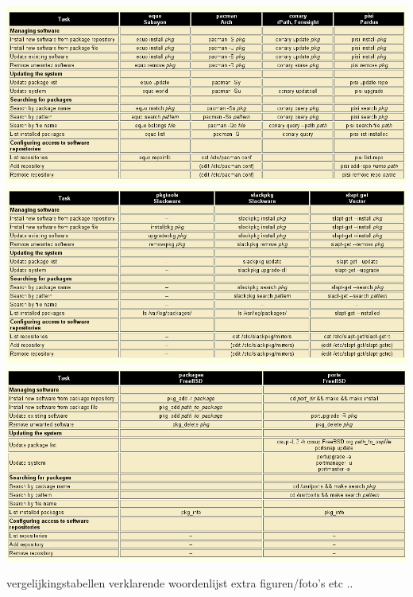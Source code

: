 \begin{center}
\includegraphics[scale=0.5]{src/package_managers_5.png}
\includegraphics[scale=0.5]{src/package_managers_6.png}
\includegraphics[scale=0.5]{src/package_managers_7.png}
\end{center}
vergelijkingstabellen
verklarende woordenlijst
extra figuren/foto's
etc ..
